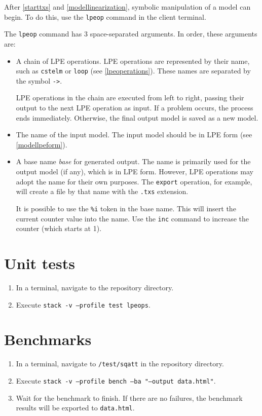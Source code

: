 After \ref{starttxs} and \ref{modellinearization}, symbolic manipulation of a \txs{} model can begin.
To do this, use the \texttt{lpeop} command in the client terminal.

The \texttt{lpeop} command has 3 space-separated arguments. In order, these arguments are:

\begin{itemize}
\item A chain of LPE operations.
LPE operations are represented by their name, such as \texttt{cstelm} or \texttt{loop} (see \ref{lpeoperations}).
These names are separated by the symbol \texttt{->}.

LPE operations in the chain are executed from left to right, passing their output to the next LPE operation as input.
If a problem occurs, the process ends immediately.
Otherwise, the final output model is saved as a new model.
\item The name of the input model.
The input model should be in LPE form (see \ref{modellpeform}).
\item A base name \textit{base} for generated output.
The name is primarily used for the output model (if any), which is in LPE form.
However, LPE operations may adopt the name for their own purposes.
The \texttt{export} operation, for example, will create a file by that name with the \texttt{.txs} extension.

It is possible to use the \texttt{\%i} token in the base name.
This will insert the current counter value into the name.
Use the \texttt{inc} command to increase the counter (which starts at 1).
\end{itemize}

\section{Unit tests}

\begin{enumerate}
\item In a terminal, navigate to the repository directory.
\item Execute \texttt{stack -v --profile test lpeops}.
\end{enumerate}

\section{Benchmarks}

\begin{enumerate}
\item In a terminal, navigate to \texttt{/test/sqatt} in the repository directory.
\item Execute \texttt{stack -v --profile bench --ba "--output data.html"}.
\item Wait for the benchmark to finish.
If there are no failures, the benchmark results will be exported to \texttt{data.html}.
\end{enumerate}

